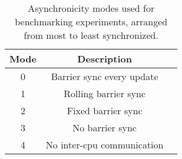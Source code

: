 \begin{table}
  \centering
  \begin{tabular}{ccl}
    \toprule
    Mode & Description\\
    \midrule
    0 & Barrier sync every update\\
    1 & Rolling barrier sync\\
    2 & Fixed barrier sync\\
    3 & No barrier sync\\
    4 & No inter-cpu communication\\
  \bottomrule
\end{tabular}
  \caption{Asynchronicity modes used for benchmarking experiments, arranged from most to least synchronized.}
  \label{tab:asynchronicity_modes}
\end{table}

